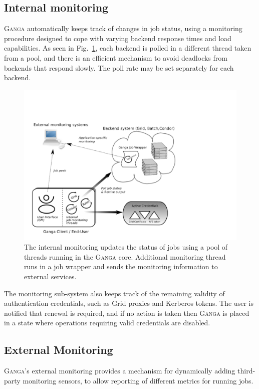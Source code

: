 \documentclass{elsart}
\def\ganga {\textsc{Ganga}\xspace}
\def\grid {Grid\xspace}
\begin{document}
\subsection{Internal monitoring}
\label{sec:GangaMonitoring}
\ganga automatically keeps track of changes in job status, using a
monitoring procedure designed to cope with
varying backend response times and load capabilities. As seen in
Fig.~\ref{fig:job_status_monitoring_mechanism}, each backend is polled in a
different thread taken from a pool, and there is an efficient mechanism
to avoid deadlocks from backends that respond slowly. The poll rate may be
set separately for each backend.
\begin{figure}[htbp]
  \begin{center}
    \includegraphics[width=1 \textwidth]{monitoring}
    \caption{The internal monitoring updates the status of jobs using a pool of threads running in the \ganga core. Additional monitoring thread runs in a job wrapper and sends the monitoring information to external services. }
    \label{fig:job_status_monitoring_mechanism}
  \end{center}
\end{figure}

The monitoring sub-system also keeps track of the remaining validity of
authentication credentials, such as \grid proxies and Kerberos tokens.
The user is notified that renewal is required, and if no action is
taken then \ganga is placed in a state where operations requiring
valid credentials are disabled.

\subsection{External Monitoring}
\label{sec:ExternalMonitoring}
\ganga's external monitoring provides a mechanism for dynamically adding third-party
monitoring sensors, to allow reporting of different metrics for running jobs.
\end{document}
